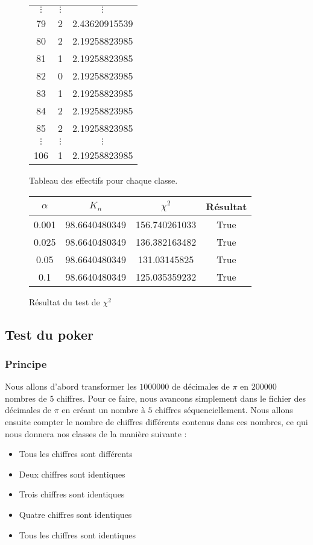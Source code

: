 \documentclass[a4paper,10pt]{article}
\begin{document}
\begin{figure}[H]
\begin{center}
\begin{longtable}{|c|c|c|}
$\vdots$ & $\vdots$ & $\vdots$ \\ 
79 & 2 & 2.43620915539\\
80 & 2 & 2.19258823985\\
81 & 1 & 2.19258823985\\
82 & 0 & 2.19258823985\\
83 & 1 & 2.19258823985\\
84 & 2 & 2.19258823985\\
85 & 2 & 2.19258823985\\
$\vdots$ & $\vdots$ & $\vdots$ \\ 
106 & 1 & 2.19258823985\\
\hline
\end{longtable}
\end{center}
\caption{Tableau des effectifs pour chaque classe.}
\end{figure}
\begin{figure}[H]
\begin{center}
\begin{tabular}{|c|c|c|c|}
\hline
$\alpha$ & $K_n$ & $\chi^2$ & Résultat\\
\hline
0.001 & 98.6640480349 & 156.740261033 & True\\
0.025 & 98.6640480349 & 136.382163482 & True\\
0.05 & 98.6640480349 & 131.03145825 & True\\
0.1 & 98.6640480349 & 125.035359232 & True\\
\hline
\end{tabular}
\end{center}
\caption{Résultat du test de $\chi^2$}
\end{figure} 

\subsection{Test du poker}
\subsubsection*{Principe}
Nous allons d'abord transformer les $1 000 000$ de décimales de $\pi$ en $200 000$ nombres de $5$ chiffres. Pour ce faire, nous 
avancons simplement dans le fichier des décimales de $\pi$ en créant un nombre à $5$ chiffres séquenciellement.
Nous allons ensuite compter le nombre de chiffres différents contenus dans ces nombres, ce qui nous donnera nos classes de la manière
suivante : \\
\begin{itemize}
\item Tous les chiffres sont différents
\item Deux chiffres sont identiques
\item Trois chiffres sont identiques
\item Quatre chiffres sont identiques
\item Tous les chiffres sont identiques
\end{itemize}
\end{document}
